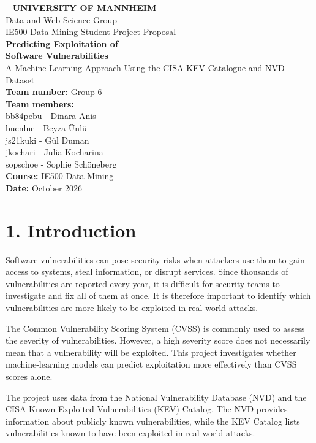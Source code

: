 \documentclass[11pt, a4paper]{article}
\begin{document}
	
	\begin{center}
		~\vfill
		{\Large \textbf{UNIVERSITY OF MANNHEIM}} \\[8pt]
		{\large Data and Web Science Group} \\[8pt]
		IE500 Data Mining Student Project Proposal \\[24pt]
		
		{\huge \textbf{Predicting Exploitation of \\ Software Vulnerabilities}} \\[12pt]
		{\large A Machine Learning Approach Using the CISA KEV Catalogue and NVD Dataset} \\[32pt]
		
		\textbf{Team number:} Group 6 \\[12pt]
		\textbf{Team members:} \\[4pt]
		bb84pebu - Dinara Anis \\[2pt]
		buenlue - Beyza Ünlü \\[2pt]
		js21kuki - Gül Duman \\[2pt]
		jkochari - Julia Kocharina \\[2pt]
		sopschoe - Sophie Schöneberg \\[24pt]
		
		\textbf{Course:} IE500 Data Mining \\[8pt]
		\textbf{Date:} October 2026
		\vfill~
	\end{center}
	\newpage
	\vspace{20pt}
	
	\section*{1. Introduction}
	Software vulnerabilities can pose security risks when attackers use them to gain access to systems, steal information, or disrupt services. Since thousands of vulnerabilities are reported every year, it is difficult for security teams to investigate and fix all of them at once. It is therefore important to identify which vulnerabilities are more likely to be exploited in real-world attacks.
	
	The Common Vulnerability Scoring System (CVSS) is commonly used to assess the severity of vulnerabilities. However, a high severity score does not necessarily mean that a vulnerability will be exploited. This project investigates whether machine-learning models can predict exploitation more effectively than CVSS scores alone.
	
	The project uses data from the National Vulnerability Database (NVD) and the CISA Known Exploited Vulnerabilities (KEV) Catalog. The NVD provides information about publicly known vulnerabilities, while the KEV Catalog lists vulnerabilities known to have been exploited in real-world attacks.
	
\end{document}
